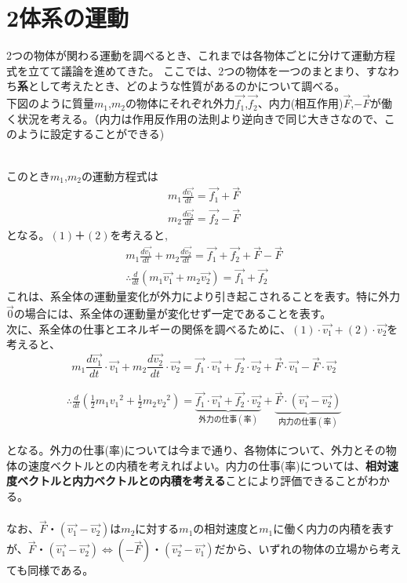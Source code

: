 \documentclass[dvipdfmx,11pt]{jsarticle}
\begin{document}
\section*{2体系の運動}
2つの物体が関わる運動を調べるとき、これまでは各物体ごとに分けて運動方程式を立てて議論を進めてきた。
ここでは、2つの物体を一つのまとまり、すなわち{\bf 系}として考えたとき、どのような性質があるのかについて調べる。\\
下図のように質量$m_1$,$m_2$の物体にそれぞれ外力$\vec{f_1}$,$\vec{f_2}$、内力(相互作用)$\vec{F}$,$-\vec{F}$が働く状況を考える。（内力は作用反作用の法則より逆向きで同じ大きさなので、このように設定することができる)
\begin{figure}[h]
    \begin{center}
        
    \end{center}
\end{figure}
\\このとき$m_1$,$m_2$の運動方程式は
{\large
\begin{eqnarray}
    m_1\frac{d\vec{v_1}}{dt} = \vec{f_1} + \vec{F}
    \\m_2\frac{d\vec{v_2}}{dt} = \vec{f_2} - \vec{F}
\end{eqnarray}
}
となる。$(1)＋(2)$を考えると,
{\large
        \begin{eqnarray*}
            m_1\frac{d\vec{v_1}}{dt}+m_2\frac{d\vec{v_2}}{dt}=\vec{f_1}+\vec{f_2}+\vec{F}-\vec{F}
            \\\therefore\frac{d}{dt}(m_1\vec{v_1}+m_2\vec{v_2})=\vec{f_1}+\vec{f_2}
        \end{eqnarray*}
    }
これは、系全体の運動量変化が外力により引き起こされることを表す。特に外力$\vec{0}$の場合には、系全体の運動量が変化せず一定であることを表す。
\\次に、系全体の仕事とエネルギーの関係を調べるために、$(1)\cdot\vec{v_1}+(2)\cdot\vec{v_2}$を考えると、
{\large
\begin{equation*}
    m_1\frac{d\vec{v_1}}{dt}\cdot\vec{v_1}+m_2\frac{d\vec{v_2}}{dt}\cdot\vec{v_2}=\vec{f_1}\cdot\vec{v_1}+\vec{f_2}\cdot\vec{v_2}+\vec{F}\cdot\vec{v_1}-\vec{F}\cdot\vec{v_2}
\end{equation*}
}
\begin{screen}
    {\large
        \begin{eqnarray*}
            \therefore\frac{d}{dt}\left(\frac{1}{2}m_1{v_1}^2+\frac{1}{2}m_2{v_2}^2\right)=\underbrace{\vec{f_1}\cdot\vec{v_1}+\vec{f_2}\cdot\vec{v_2}}_{外力の仕事(率)}+\underbrace{\vec{F}\cdot(\vec{v_1}-\vec{v_2})}_{内力の仕事(率)}
        \end{eqnarray*}
    }
\end{screen}
となる。外力の仕事(率)については今まで通り、各物体について、外力とその物体の速度ベクトルとの内積を考えればよい。内力の仕事(率)については、{\bf 相対速度ベクトルと内力ベクトルとの内積を考える}ことにより評価できることがわかる。
\\\\なお、$\vec{F}・(\vec{v_1}-\vec{v_2})$は$m_2$に対する$m_1$の相対速度と$m_1$に働く内力の内積を表すが、$\vec{F}・(\vec{v_1}-\vec{v_2})\Leftrightarrow(-\vec{F})・(\vec{v_2}-\vec{v_1})$だから、いずれの物体の立場から考えても同様である。
\end{document}
